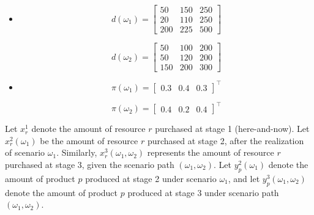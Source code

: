 \documentclass[8pt]{article}
\begin{document}
\begin{itemize}
    \item[]
          \begin{minipage}{0.47\textwidth}
              \[
                  d(\omega_1) =
                  \begin{bmatrix}
                      50  & 150 & 250 \\
                      20  & 110 & 250 \\
                      200 & 225 & 500
                  \end{bmatrix}
              \]
          \end{minipage}
          \hfill
          \begin{minipage}{0.47\textwidth}
              \[
                  d(\omega_2) =
                  \begin{bmatrix}
                      50  & 100 & 200 \\
                      50  & 120 & 200 \\
                      150 & 200 & 300
                  \end{bmatrix}
              \]
          \end{minipage}
    \item[]
          \begin{minipage}{0.47\textwidth}
              \[
                  \pi(\omega_1) =
                  \begin{bmatrix}
                      0.3 & 0.4 & 0.3
                  \end{bmatrix}^\top
              \]
          \end{minipage}
          \hfill
          \begin{minipage}{0.47\textwidth}
              \[
                  \pi(\omega_2) =
                  \begin{bmatrix}
                      0.4 & 0.2 & 0.4
                  \end{bmatrix}^\top
              \]
          \end{minipage}
\end{itemize}

\noindent
Let $x_r^1$ denote the amount of resource $r$ purchased at stage 1 (here-and-now).
Let $x_r^2(\omega_1)$ be the amount of resource $r$ purchased at stage 2, after the realization of scenario $\omega_1$.
Similarly, $x_r^3(\omega_1, \omega_2)$ represents the amount of resource $r$ purchased at stage 3, given the scenario path $(\omega_1, \omega_2)$.
Let $y_p^2(\omega_1)$ denote the amount of product $p$ produced at stage 2 under scenario $\omega_1$,
and let $y_p^3(\omega_1, \omega_2)$ denote the amount of product $p$ produced at stage 3 under scenario path $(\omega_1, \omega_2)$.
\end{document}
